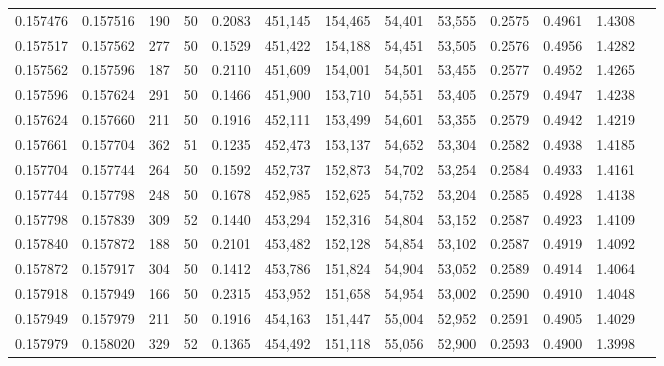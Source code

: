 \begin{tabular}{rrrrrrrrrrrrr}
0.157476 & 0.157516 &   190 &  50 &                                     0.2083 & 451,145 & 154,465 &  54,401 &  53,555 & 0.2575 & 0.4961 & 1.4308 \\
0.157517 & 0.157562 &   277 &  50 &                                     0.1529 & 451,422 & 154,188 &  54,451 &  53,505 & 0.2576 & 0.4956 & 1.4282 \\
0.157562 & 0.157596 &   187 &  50 &                                     0.2110 & 451,609 & 154,001 &  54,501 &  53,455 & 0.2577 & 0.4952 & 1.4265 \\
0.157596 & 0.157624 &   291 &  50 &                                     0.1466 & 451,900 & 153,710 &  54,551 &  53,405 & 0.2579 & 0.4947 & 1.4238 \\
0.157624 & 0.157660 &   211 &  50 &                                     0.1916 & 452,111 & 153,499 &  54,601 &  53,355 & 0.2579 & 0.4942 & 1.4219 \\
0.157661 & 0.157704 &   362 &  51 &                                     0.1235 & 452,473 & 153,137 &  54,652 &  53,304 & 0.2582 & 0.4938 & 1.4185 \\
0.157704 & 0.157744 &   264 &  50 &                                     0.1592 & 452,737 & 152,873 &  54,702 &  53,254 & 0.2584 & 0.4933 & 1.4161 \\
0.157744 & 0.157798 &   248 &  50 &                                     0.1678 & 452,985 & 152,625 &  54,752 &  53,204 & 0.2585 & 0.4928 & 1.4138 \\
0.157798 & 0.157839 &   309 &  52 &                                     0.1440 & 453,294 & 152,316 &  54,804 &  53,152 & 0.2587 & 0.4923 & 1.4109 \\
0.157840 & 0.157872 &   188 &  50 &                                     0.2101 & 453,482 & 152,128 &  54,854 &  53,102 & 0.2587 & 0.4919 & 1.4092 \\
0.157872 & 0.157917 &   304 &  50 &                                     0.1412 & 453,786 & 151,824 &  54,904 &  53,052 & 0.2589 & 0.4914 & 1.4064 \\
0.157918 & 0.157949 &   166 &  50 &                                     0.2315 & 453,952 & 151,658 &  54,954 &  53,002 & 0.2590 & 0.4910 & 1.4048 \\
0.157949 & 0.157979 &   211 &  50 &                                     0.1916 & 454,163 & 151,447 &  55,004 &  52,952 & 0.2591 & 0.4905 & 1.4029 \\
0.157979 & 0.158020 &   329 &  52 &                                     0.1365 & 454,492 & 151,118 &  55,056 &  52,900 & 0.2593 & 0.4900 & 1.3998 \\

\end{tabular}
